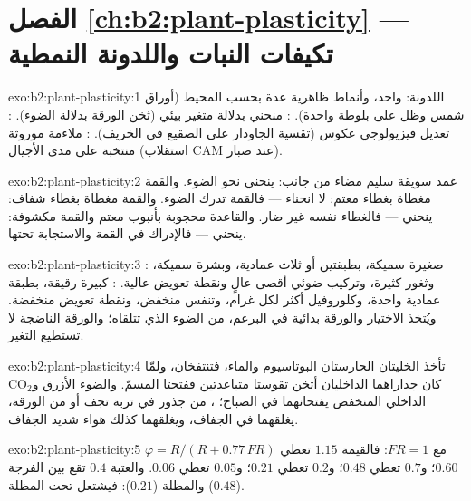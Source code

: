 \section*{الفصل \ref{ch:b2:plant-plasticity} --- تكيفات النبات واللدونة النمطية}

\begin{solution}{exo:b2:plant-plasticity:1}
اللدونة:  واحد، وأنماط ظاهرية عدة بحسب
المحيط (أوراق شمس وظل على بلوطة واحدة). :
منحني   بدلالة متغير
بيئي (ثخن الورقة بدلالة الضوء). : تعديل
فيزيولوجي عكوس (تقسية الجاودار على الصقيع في الخريف).
: ملاءمة موروثة منتخبة على مدى الأجيال (استقلاب
CAM عند صبار).
\end{solution}

\begin{solution}{exo:b2:plant-plasticity:2}
غمد سويقة سليم مضاء من جانب: ينحني نحو الضوء. والقمة
مغطاة بغطاء معتم: لا انحناء --- فالقمة تدرك
الضوء. والقمة مغطاة بغطاء شفاف: ينحني --- فالغطاء نفسه
غير ضار. والقاعدة محجوبة بأنبوب معتم والقمة مكشوفة: ينحني ---
فالإدراك في القمة والاستجابة تحتها.
\end{solution}

\begin{solution}{exo:b2:plant-plasticity:3}
: صغيرة سميكة، بطبقتين أو ثلاث عمادية، وبشرة
سميكة، وثغور كثيرة، وتركيب ضوئي أقصى عالٍ ونقطة تعويض
عالية. : كبيرة رقيقة، بطبقة عمادية واحدة،
وكلوروفيل أكثر لكل غرام، وتنفس منخفض، ونقطة تعويض منخفضة.
ويُتخذ الاختيار والورقة بدائية في البرعم، من
الضوء الذي تتلقاه؛ والورقة الناضجة لا تستطيع التغير.
\end{solution}

\begin{solution}{exo:b2:plant-plasticity:4}
تأخذ الخليتان الحارستان البوتاسيوم والماء، فتنتفخان، ولمّا كان
جداراهما الداخليان أثخن تقوستا متباعدتين ففتحتا المسمّ. والضوء الأزرق
و$\mathrm{CO_2}$ الداخلي المنخفض يفتحانهما في الصباح؛ ، من جذور في تربة تجف أو من الورقة، يغلقهما في
الجفاف، ويغلقهما كذلك هواء شديد الجفاف.
\end{solution}

\begin{solution}{exo:b2:plant-plasticity:5}
$\varphi = R/(R + 0.77\,FR)$ مع $FR = 1$: فالقيمة $1.15$ تعطي $0.60$؛ و$0.7$ تعطي
$0.48$؛ و$0.2$ تعطي $0.21$؛ و$0.05$ تعطي $0.06$. والعتبة $0.4$ تقع
بين الفرجة ($0.48$) والمظلة ($0.21$): فيشتعل 
تحت المظلة.
\end{solution}

